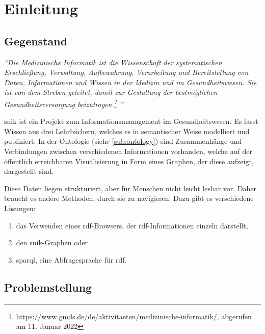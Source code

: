 \chapter{Einleitung}\label{ch:introduction}

\section{Gegenstand}
\begin{flushright}{\slshape
\enquote{Die Medizinische Informatik ist die Wissenschaft der systematischen Erschließung, Verwaltung, Aufbewahrung, Verarbeitung und Bereitstellung von Daten, Informationen und Wissen in der Medizin und im Gesundheitswesen.
Sie ist von dem Streben geleitet, damit zur Gestaltung der bestmöglichen Gesundheitsversorgung beizutragen.\footnote{\url{https://www.gmds.de/de/aktivitaeten/medizinische-informatik/}, abgerufen am 11. Januar 2022}
}}
\end{flushright}
\ac{snik} ist ein Projekt zum Informationsmanagement im Gesundheitswesen.
Es fasst Wissen aus drei Lehrbüchern, welches es in semantischer Weise modelliert und publiziert.
In der Ontologie (siehe \cref{sub:ontology}) sind Zusammenhänge und Verbindungen zwischen verschiedenen Informationen vorhanden, welche auf der öffentlich erreichbaren Visualisierung in Form eines Graphen, der diese aufzeigt, dargestellt sind.

Diese Daten liegen strukturiert, aber für Menschen nicht leicht lesbar vor. Daher braucht es andere Methoden, durch sie zu navigieren.
Dazu gibt es verschiedene Lösungen:
\begin{enumerate}
	\item das Verwenden eines \acs{rdf}-Browsers, der \acs{rdf}-Informationen einzeln darstellt,
	\item den \ac{snik}-Graphen oder
	\item \acs{sparql}, eine Abfragesprache für \acs{rdf}.
\end{enumerate}

\section{Problemstellung}\label{sec:problemstellung}

